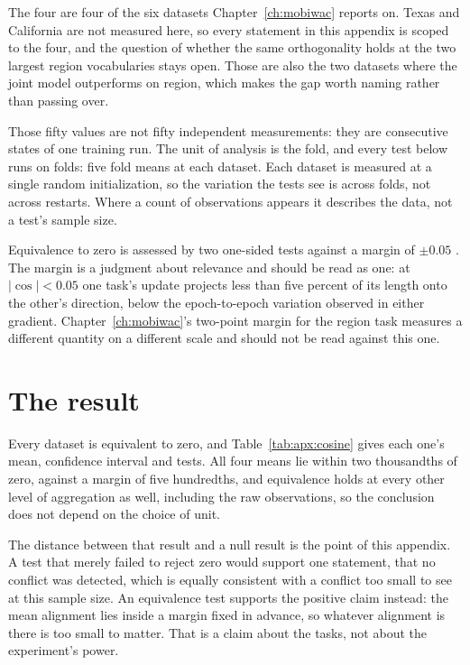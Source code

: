 The four are four of the six datasets Chapter~\ref{ch:mobiwac} reports on. Texas and California are
not measured here, so every statement in this appendix is scoped to the four, and the question of
whether the same orthogonality holds at the two largest region vocabularies stays open. Those are
also the two datasets where the joint model outperforms on region, which makes the gap worth naming
rather than passing over.

Those fifty values are not fifty independent measurements: they are consecutive states of one
training run.
The unit of analysis is the fold, and every test below runs on folds: five fold means at each
dataset.
Each dataset is measured at a single random initialization, so the variation the tests see is
across folds, not across restarts. Where a count of observations appears it describes the data, not
a test's sample size.

Equivalence to zero is assessed by two one-sided tests against a margin of $\pm 0.05$
\cite{lakens2017tost}. The margin is a judgment about relevance and should be read as one: at
$|\cos| < 0.05$ one task's update projects less than five percent of its length onto the other's
direction, below the epoch-to-epoch variation observed in either gradient. Chapter~\ref{ch:mobiwac}'s two-point margin for the region task measures a
different quantity on a different scale and should not be read against this one.

\section{The result}
\label{apx:cosine:result}



Every dataset is equivalent to zero, and Table~\ref{tab:apx:cosine} gives each one's mean, confidence
interval and tests. All four means lie within two thousandths of zero, against a margin of
five hundredths, and equivalence holds at every other level of aggregation as well, including the raw
observations, so the conclusion does not depend on the choice of unit.

The distance between that result and a null result is the point of this appendix.
A test that merely
failed to reject zero would support one statement, that no conflict was detected, which is equally
consistent with a conflict too small to see at this sample size. An equivalence test supports the
positive claim instead: the mean alignment lies inside a margin fixed in advance, so whatever
alignment is there is too small to matter. That is a claim about the tasks, not about the
experiment's power.

